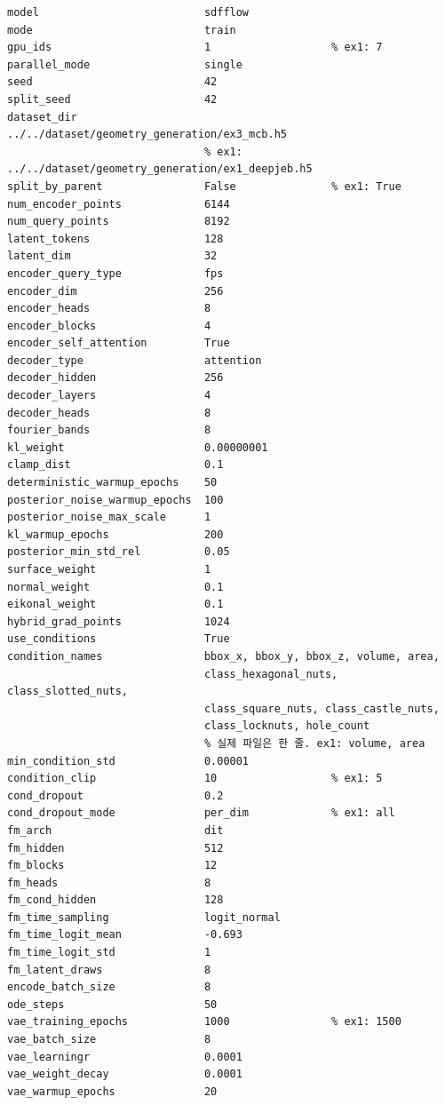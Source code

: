 \documentclass[11pt]{article}
\begin{document}
\begin{Verbatim}[fontsize=\footnotesize, frame=single, framesep=2mm]
model                          sdfflow
mode                           train
gpu_ids                        1                   % ex1: 7
parallel_mode                  single
seed                           42
split_seed                     42
dataset_dir                    ../../dataset/geometry_generation/ex3_mcb.h5
                               % ex1: ../../dataset/geometry_generation/ex1_deepjeb.h5
split_by_parent                False               % ex1: True
num_encoder_points             6144
num_query_points               8192
latent_tokens                  128
latent_dim                     32
encoder_query_type             fps
encoder_dim                    256
encoder_heads                  8
encoder_blocks                 4
encoder_self_attention         True
decoder_type                   attention
decoder_hidden                 256
decoder_layers                 4
decoder_heads                  8
fourier_bands                  8
kl_weight                      0.00000001
clamp_dist                     0.1
deterministic_warmup_epochs    50
posterior_noise_warmup_epochs  100
posterior_noise_max_scale      1
kl_warmup_epochs               200
posterior_min_std_rel          0.05
surface_weight                 1
normal_weight                  0.1
eikonal_weight                 0.1
hybrid_grad_points             1024
use_conditions                 True
condition_names                bbox_x, bbox_y, bbox_z, volume, area,
                               class_hexagonal_nuts, class_slotted_nuts,
                               class_square_nuts, class_castle_nuts,
                               class_locknuts, hole_count
                               % 실제 파일은 한 줄. ex1: volume, area
min_condition_std              0.00001
condition_clip                 10                  % ex1: 5
cond_dropout                   0.2
cond_dropout_mode              per_dim             % ex1: all
fm_arch                        dit
fm_hidden                      512
fm_blocks                      12
fm_heads                       8
fm_cond_hidden                 128
fm_time_sampling               logit_normal
fm_time_logit_mean             -0.693
fm_time_logit_std              1
fm_latent_draws                8
encode_batch_size              8
ode_steps                      50
vae_training_epochs            1000                % ex1: 1500
vae_batch_size                 8
vae_learningr                  0.0001
vae_weight_decay               0.0001
vae_warmup_epochs              20

\end{Verbatim}
\end{document}
